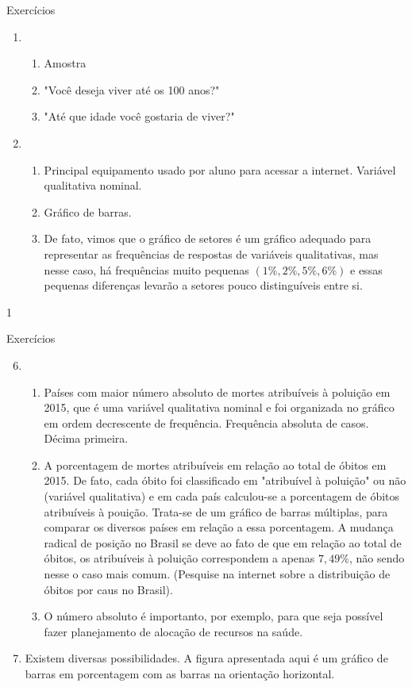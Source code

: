 {\begin{answer}{Exercícios}
{\begin{enumerate}
  \item 
  \begin{enumerate}
  \item Amostra 
  \item "Você deseja viver até os 100 anos?"
  \item "Até que idade você gostaria de viver?"
  \end{enumerate}
  \item 
  \begin{enumerate}
  \item Principal equipamento usado por aluno para acessar a internet. Variável qualitativa nominal.
  \item Gráfico de barras.
  \item De fato, vimos que o gráfico de setores é um gráfico adequado para representar as frequências de respostas de variáveis qualitativas, mas nesse caso, há frequências muito pequenas $(1\%,2\%,5\%,6\%)$ e essas pequenas diferenças levarão a setores pouco distinguíveis entre si.
  \end{enumerate}
  \end{enumerate}
}{1}
\end{answer}
\clearmargin
\begin{answer}{Exercícios}
{\exerciselist
  \begin{enumerate}\setcounter{enumi}{5}
  \item 
  \begin{enumerate}
  \item Países com maior número absoluto de mortes atribuíveis à poluição em 2015, que é uma variável qualitativa nominal e foi organizada no gráfico em ordem decrescente de frequência. Frequência absoluta de casos. Décima primeira.
  \item A porcentagem de mortes atribuíveis em relação ao total de óbitos em 2015. De fato, cada óbito foi classificado em "atribuível à poluição"{} ou não (variável qualitativa) e em cada país calculou-se a porcentagem de óbitos atribuíveis à pouição. Trata-se de um gráfico de barras múltiplas, para comparar os diversos países em relação a essa porcentagem. A mudança radical de posição no Brasil se deve ao fato de que em relação ao total de óbitos, os atribuíveis à poluição correspondem a apenas $7{,}49\%$, não sendo nesse o caso mais comum. (Pesquise na internet sobre a distribuição de óbitos por caus no Brasil).
  \item O número absoluto é importanto, por exemplo, para que seja possível fazer planejamento de alocação de recursos na saúde.
  \end{enumerate}
  \item Existem diversas possibilidades. A figura apresentada aqui é um gráfico de barras em porcentagem com as barras na orientação horizontal.
  \begin{figure}[H]
  \centering
  

\end{figure}
\end{enumerate}}
\end{answer}}
